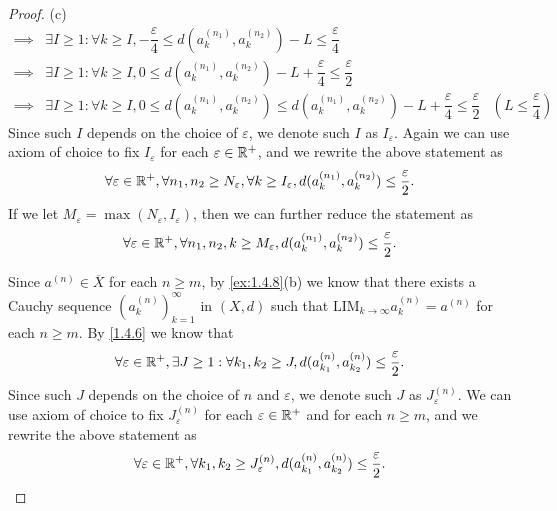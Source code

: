 \begin{proof}{(c)}
\begin{align*}
    \implies & \exists I \geq 1 : \forall k \geq I, -\dfrac{\varepsilon}{4} \leq d(a_k^{(n_1)}, a_k^{(n_2)}) - L \leq \dfrac{\varepsilon}{4}                                                                       \\
    \implies & \exists I \geq 1 : \forall k \geq I, 0 \leq d(a_k^{(n_1)}, a_k^{(n_2)}) - L + \dfrac{\varepsilon}{4} \leq \dfrac{\varepsilon}{2}                                                                    \\
    \implies & \exists I \geq 1 : \forall k \geq I, 0 \leq d(a_k^{(n_1)}, a_k^{(n_2)}) \leq d(a_k^{(n_1)}, a_k^{(n_2)}) - L + \dfrac{\varepsilon}{4} \leq \dfrac{\varepsilon}{2} & (L \leq \dfrac{\varepsilon}{4})
  \end{align*}
  Since such \(I\) depends on the choice of \(\varepsilon\), we denote such \(I\) as \(I_\varepsilon\).
  Again we can use axiom of choice to fix \(I_\varepsilon\) for each \(\varepsilon \in \mathbb{R}^+\), and we rewrite the above statement as
  \[
    \forall \varepsilon \in \mathbb{R}^+, \forall n_1, n_2 \geq N_\varepsilon, \forall k \geq I_\varepsilon, d(a_k^{(n_1)}, a_k^{(n_2)}) \leq \dfrac{\varepsilon}{2}.
  \]
  If we let \(M_\varepsilon = \max(N_\varepsilon, I_\varepsilon)\), then we can further reduce the statement as
  \[
    \forall \varepsilon \in \mathbb{R}^+, \forall n_1, n_2, k \geq M_\varepsilon, d(a_k^{(n_1)}, a_k^{(n_2)}) \leq \dfrac{\varepsilon}{2}.
  \]

  Since \(a^{(n)} \in \overline{X}\) for each \(n \geq m\), by \cref{ex:1.4.8}(b) we know that there exists a Cauchy sequence \((a_k^{(n)})_{k = 1}^\infty\) in \((X, d)\) such that \(\text{LIM}_{k \to \infty} a_k^{(n)} = a^{(n)}\) for each \(n \geq m\).
  By \cref{1.4.6} we know that
  \[
    \forall \varepsilon \in \mathbb{R}^+, \exists J \geq 1 : \forall k_1, k_2 \geq J, d(a_{k_1}^{(n)}, a_{k_2}^{(n)}) \leq \dfrac{\varepsilon}{2}.
  \]
  Since such \(J\) depends on the choice of \(n\) and \(\varepsilon\), we denote such \(J\) as \(J_\varepsilon^{(n)}\).
  We can use axiom of choice to fix \(J_\varepsilon^{(n)}\) for each \(\varepsilon \in \mathbb{R}^+\) and for each \(n \geq m\), and we rewrite the above statement as
  \[
    \forall \varepsilon \in \mathbb{R}^+, \forall k_1, k_2 \geq J_\varepsilon^{(n)}, d(a_{k_1}^{(n)}, a_{k_2}^{(n)}) \leq \dfrac{\varepsilon}{2}.
  \]


\end{proof}
